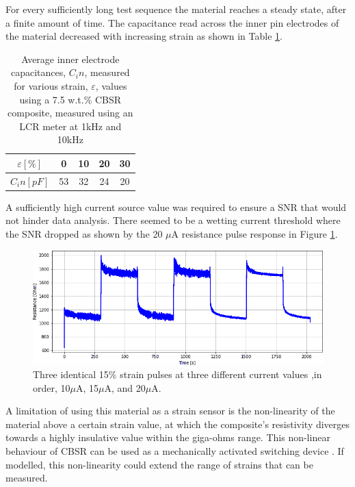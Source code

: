 For every sufficiently long test sequence the material reaches a steady state, after a finite amount of time. The capacitance read across the inner pin electrodes of the material decreased with increasing strain as shown in Table \ref{tab:capacitance_v_strain}.
\begin{table}[H]
	\centering
	\caption{Average inner electrode capacitances, $C_in$, measured for various strain, $\varepsilon$, values using a 7.5 w.t.\% CBSR composite, measured using an LCR meter at 1kHz and 10kHz \newline}
	\label{tab:capacitance_v_strain}
	\begin{tabular}{c|cccc}
		$\varepsilon [\%]$ & 0 & 10 & 20 & 30 \\
		\hline
		$C_in [pF]$ & 53 & 32 & 24 & 20 \\
	\end{tabular}
\end{table}

A sufficiently high current source value was required to ensure a SNR that would not hinder data analysis. There seemed to be a wetting current threshold where the SNR dropped as shown by the 20 $\mu$A resistance pulse response in Figure \ref{fig:multi_current}.
\begin{figure}[H]
	\centering
	\includegraphics[width=0.7\linewidth]{Figures/test_multicurrent_2_7-5_v3_res_only.png}
	\caption{Three identical 15\% strain pulses at three different current values ,in order, 10$\mu$A, 15$\mu$A, and 20$\mu$A.}
	\label{fig:multi_current}
\end{figure}





A limitation of using this material as a strain sensor is the non-linearity of the material above a certain strain value, at which the composite's resistivity diverges towards a highly insulative value within the giga-ohms range. This non-linear behaviour of CBSR can be used as a mechanically activated switching device \cite{Henke2018}. If modelled, this non-linearity could extend the range of strains that can be measured.



